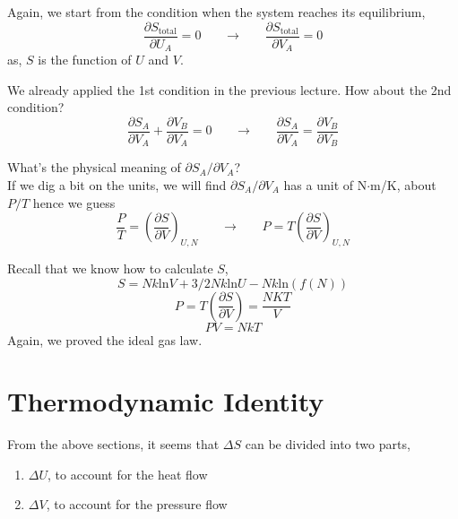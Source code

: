 \documentclass[twoside]{article}
\begin{document}
Again, we start from the condition when the system reaches its equilibrium,
\begin{equation} \label{entropy} 
\frac {\partial{S_\text{total}}} {\partial{U_A}}=0     ~~~~~~~~ \rightarrow~~~~~~~~  \frac {\partial{S_\text{total}}} {\partial{V_A}}=0
\end{equation}
as, $S$ is the function of $U$ and $V$.

We already applied the 1st condition in the previous lecture. How about the 2nd condition? 
\begin{equation} \label{entropy} 
\frac {\partial{S_A}} {\partial{V_A}} +  \frac {\partial{V_B}} {\partial{V_A}} =0     ~~~~~~~~ \rightarrow~~~~~~~~  
\frac {\partial{S_A}} {\partial{V_A}} =  \frac {\partial{V_B}} {\partial{V_B}} 
\end{equation}

What's the physical meaning of $\partial{S_A}/\partial{V_A}$? \\
If we dig a bit on the units, we will find $\partial{S_A}/\partial{V_A}$ has a unit of N$\cdot$m/K, about $P/T$ hence we guess
\begin{equation} \label{entropy} 
\frac {P}{T} =  (\frac {\partial{S}} {\partial{V}})_{U,N}     ~~~~~~~~ \rightarrow~~~~~~~~  
P = T (\frac {\partial{S}} {\partial{V}})_{U,N}
\end{equation}

Recall that we know how to calculate $S$,
\begin{equation} S = Nk\text{ln}V + 3/2Nk\text{ln}U - Nk\text{ln}(f(N)) \end{equation}
\begin{equation} P = T(\frac {\partial{S}} {\partial{V}})  = \frac{NKT}{V}\end{equation}
\begin{equation} PV = NkT \end{equation}
Again, we proved the ideal gas law.

\section{Thermodynamic Identity}
From the above sections, it seems that $\Delta{S}$ can be divided into two parts, 
\begin{enumerate}
\item $\Delta{U}$, to account for the heat flow
\item $\Delta{V}$, to account for the pressure flow
\end{enumerate}
\end{document}
